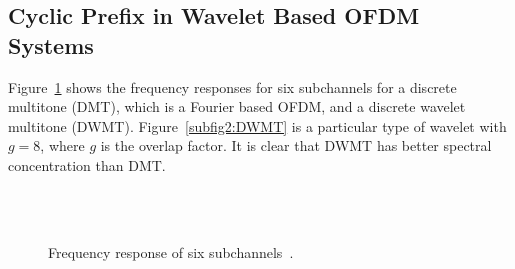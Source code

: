 		\subsection{Cyclic Prefix in Wavelet Based OFDM Systems}
			Figure~\ref{fig2:DMTvs.DWMT} shows the frequency responses for six subchannels for a discrete multitone (DMT), which is a Fourier based OFDM, and a discrete wavelet multitone (DWMT). Figure~\ref{subfig2:DWMT} is a particular type of wavelet with $ g=8 $, where $ g $ is the overlap factor. It is clear that DWMT has better spectral concentration than DMT.
			\begin{figure}[h]
				\centering
				\hfill \\
				\hfill \\
				\caption{Frequency response of six subchannels~\protect\cite{1995-sandberg}.}
				\label{fig2:DMTvs.DWMT}
			\end{figure}
